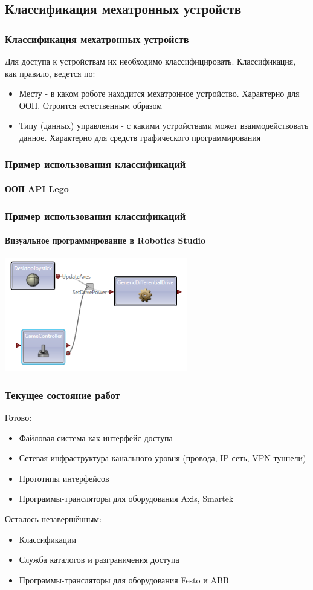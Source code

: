 \documentclass{beamer}
\begin{document}
\subsection{Классификация мехатронных устройств}
\begin{frame}
\frametitle{Классификация мехатронных устройств}
Для доступа к устройствам их необходимо классифицировать.
Классификация, как правило, ведется по:
\begin{itemize}
  \item<1> Месту - в каком роботе находится мехатронное устройство. Характерно
  для ООП. Строится естественным образом
  \item<1> Типу (данных) управления - с какими устройствами может
  взаимодействовать данное. Характерно для средств графического
  программирования
\end{itemize}
\end{frame}

\begin{frame}
\frametitle{Пример использования классификаций}
\framesubtitle{ООП API Lego}

\end{frame}

\begin{frame}
\frametitle{Пример использования классификаций}
\framesubtitle{Визуальное программирование в Robotics Studio}
\includegraphics[width=8cm]{rs.png}
\end{frame}

\begin{frame}
\frametitle{Текущее состояние работ}
Готово:
\begin{itemize}
  \item<1> Файловая система как интерфейс доступа
  \item<1> Сетевая инфраструктура канального уровня (провода, IP сеть, VPN
  туннели)
  \item<1> Прототипы интерфейсов
  \item<1> Программы-трансляторы для оборудования Axis, Smartek
\end{itemize}
Осталось незавершённым:
\begin{itemize}
  \item<1> Классификации
  \item<1> Служба каталогов и разграничения доступа
  \item<1> Программы-трансляторы для оборудования Festo и ABB
\end{itemize}
\end{frame}
\end{document}
